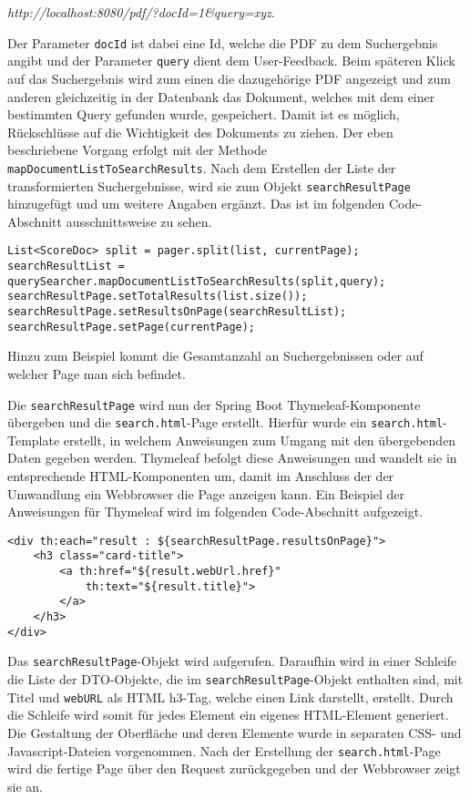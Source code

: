\textit{http://localhost:8080/pdf/?docId=1\&query=xyz}.

Der Parameter \texttt{docId} ist dabei eine Id, welche die PDF zu dem Suchergebnis angibt und der Parameter \texttt{query} dient dem User-Feedback.
Beim späteren Klick auf das Suchergebnis wird zum einen die dazugehörige PDF angezeigt und zum anderen gleichzeitig in der Datenbank das Dokument, welches mit dem einer bestimmten Query gefunden wurde, gespeichert.
Damit ist es möglich, Rückschlüsse auf die Wichtigkeit des Dokuments zu ziehen.
Der eben beschriebene Vorgang erfolgt mit der Methode \texttt{mapDocumentListToSearchResults}.
Nach dem Erstellen der Liste der transformierten Suchergebnisse, wird sie zum Objekt \texttt{searchResultPage} hinzugefügt und um weitere Angaben ergänzt.
Das ist im folgenden Code-Abschnitt ausschnittsweise zu sehen.
\pagebreak

\begin{lstlisting}
List<ScoreDoc> split = pager.split(list, currentPage);
searchResultList = querySearcher.mapDocumentListToSearchResults(split,query);
searchResultPage.setTotalResults(list.size());
searchResultPage.setResultsOnPage(searchResultList);
searchResultPage.setPage(currentPage);
\end{lstlisting}

Hinzu zum Beispiel kommt die Gesamtanzahl an Suchergebnissen oder auf welcher Page man sich befindet.

Die \texttt{searchResultPage} wird nun der Spring Boot Thymeleaf-Komponente übergeben und die \texttt{search.html}-Page erstellt.
Hierfür wurde ein \texttt{search.html}-Template erstellt, in welchem Anweisungen zum Umgang mit den übergebenden Daten gegeben werden.
Thymeleaf befolgt diese Anweisungen und wandelt sie in entsprechende HTML-Komponenten um, damit im Anschluss der der Umwandlung ein Webbrowser die Page anzeigen kann.
Ein Beispiel der Anweisungen für Thymeleaf wird im folgenden Code-Abschnitt aufgezeigt.

\begin{lstlisting}
<div th:each="result : ${searchResultPage.resultsOnPage}">
	<h3 class="card-title">
		<a th:href="${result.webUrl.href}"
			th:text="${result.title}">
		</a>
	</h3>
</div>
\end{lstlisting}

Das \texttt{searchResultPage}-Objekt wird aufgerufen.
Daraufhin wird in einer Schleife die Liste der DTO-Objekte, die im \texttt{searchResultPage}-Objekt enthalten sind, mit Titel und \texttt{webURL} als HTML h3-Tag, welche einen Link darstellt, erstellt.
Durch die Schleife wird somit für jedes Element ein eigenes HTML-Element generiert.
Die Gestaltung der Oberfläche und deren Elemente wurde in separaten CSS- und Javascript-Dateien vorgenommen.
Nach der Erstellung der \texttt{search.html}-Page wird die fertige Page über den Request zurückgegeben und der Webbrowser zeigt sie an.